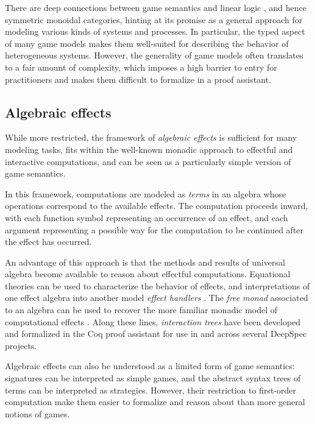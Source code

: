 \documentclass[11pt,oneside]{book}
\theoremstyle{definition}
\begin{document}
There are deep connections between
game semantics and linear logic \citep{gsnecessary},
and hence symmetric monoidal categories,
hinting at its promise
as a general approach for modeling
various kinds of systems and processes.
In particular,
the typed aspect of many game models
makes them well-suited for
describing the behavior of heterogeneous systems.
However,
the generality of game models
often translates to a fair amount of complexity,
which imposes a high barrier to entry for practitioners
and makes them difficult to formalize in a proof assistant.


\subsection{Algebraic effects} %

While more restricted,
the framework of \emph{algebraic effects} \citep{effadq}
is sufficient for many modeling tasks,
fits within the well-known monadic approach
to effectful and interactive computations,
and can be seen as a particularly simple version
of game semantics.

In this framework,
computations are modeled as \emph{terms}
in an algebra whose operations correspond to
the available effects. %
The computation proceeds inward,
with each function symbol representing an occurrence of an effect,
and each argument representing a possible way
for the computation to be continued
after the effect has occurred.

An advantage of this approach is that
the methods and results of universal algebra
become available to reason about effectful computations.
Equational theories can be used to characterize
the behavior of effects, and interpretations
of one effect algebra into another model
\emph{effect handlers} \citep{eff}.
The \emph{free monad} associated to an algebra
can be used to recover the more familiar
monadic model of computational effects \citep{monads}.
Along these lines,
\emph{interaction trees} \citep{itree}
have been developed
and formalized in the Coq proof assistant
for use in and across
several DeepSpec projects.

Algebraic effects can also be understood as
a limited form of game semantics:
signatures can be interpreted as simple games,
and the abstract syntax trees of terms
can be interpreted as strategies.
However,
their restriction to first-order computation
make them easier to formalize and reason about
than more general notions of games.
\end{document}
